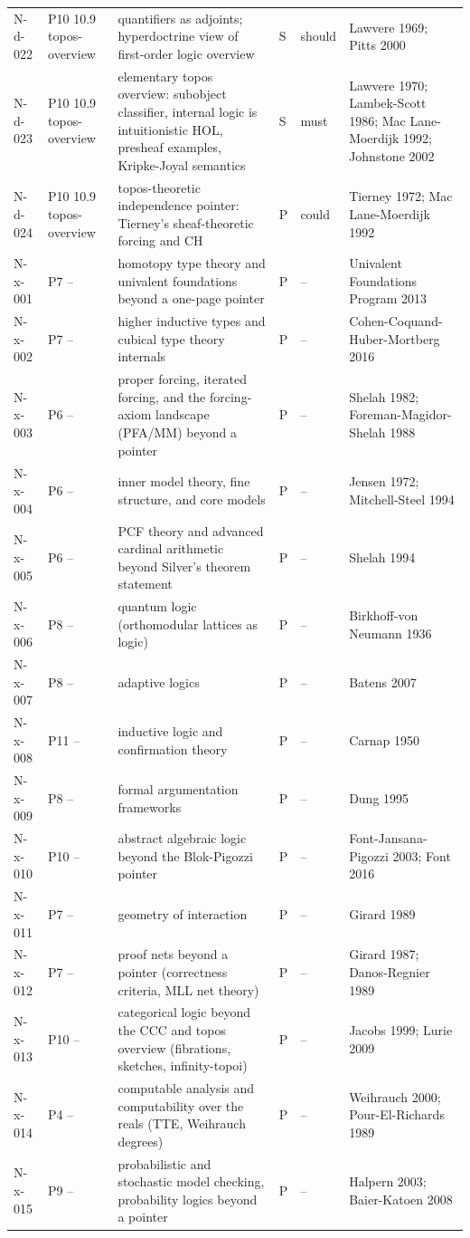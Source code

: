 \begin{longtable}{@{}p{0.52in}p{0.85in}p{2.5in}p{0.22in}p{0.42in}p{1.95in}@{}}
N-d-022 & P10 10.9 topos-overview & quantifiers as adjoints; hyperdoctrine view of first-order logic overview & S & should & Lawvere 1969; Pitts 2000 \\
N-d-023 & P10 10.9 topos-overview & elementary topos overview: subobject classifier, internal logic is intuitionistic HOL, presheaf examples, Kripke-Joyal semantics & S & must & Lawvere 1970; Lambek-Scott 1986; Mac Lane-Moerdijk 1992; Johnstone 2002 \\
N-d-024 & P10 10.9 topos-overview & topos-theoretic independence pointer: Tierney's sheaf-theoretic forcing and CH & P & could & Tierney 1972; Mac Lane-Moerdijk 1992 \\
N-x-001 & P7 -- & homotopy type theory and univalent foundations beyond a one-page pointer & P & -- & Univalent Foundations Program 2013 \\
N-x-002 & P7 -- & higher inductive types and cubical type theory internals & P & -- & Cohen-Coquand-Huber-Mortberg 2016 \\
N-x-003 & P6 -- & proper forcing, iterated forcing, and the forcing-axiom landscape (PFA/MM) beyond a pointer & P & -- & Shelah 1982; Foreman-Magidor-Shelah 1988 \\
N-x-004 & P6 -- & inner model theory, fine structure, and core models & P & -- & Jensen 1972; Mitchell-Steel 1994 \\
N-x-005 & P6 -- & PCF theory and advanced cardinal arithmetic beyond Silver's theorem statement & P & -- & Shelah 1994 \\
N-x-006 & P8 -- & quantum logic (orthomodular lattices as logic) & P & -- & Birkhoff-von Neumann 1936 \\
N-x-007 & P8 -- & adaptive logics & P & -- & Batens 2007 \\
N-x-008 & P11 -- & inductive logic and confirmation theory & P & -- & Carnap 1950 \\
N-x-009 & P8 -- & formal argumentation frameworks & P & -- & Dung 1995 \\
N-x-010 & P10 -- & abstract algebraic logic beyond the Blok-Pigozzi pointer & P & -- & Font-Jansana-Pigozzi 2003; Font 2016 \\
N-x-011 & P7 -- & geometry of interaction & P & -- & Girard 1989 \\
N-x-012 & P7 -- & proof nets beyond a pointer (correctness criteria, MLL net theory) & P & -- & Girard 1987; Danos-Regnier 1989 \\
N-x-013 & P10 -- & categorical logic beyond the CCC and topos overview (fibrations, sketches, infinity-topoi) & P & -- & Jacobs 1999; Lurie 2009 \\
N-x-014 & P4 -- & computable analysis and computability over the reals (TTE, Weihrauch degrees) & P & -- & Weihrauch 2000; Pour-El-Richards 1989 \\
N-x-015 & P9 -- & probabilistic and stochastic model checking, probability logics beyond a pointer & P & -- & Halpern 2003; Baier-Katoen 2008 \\
\end{longtable}
\endgroup
